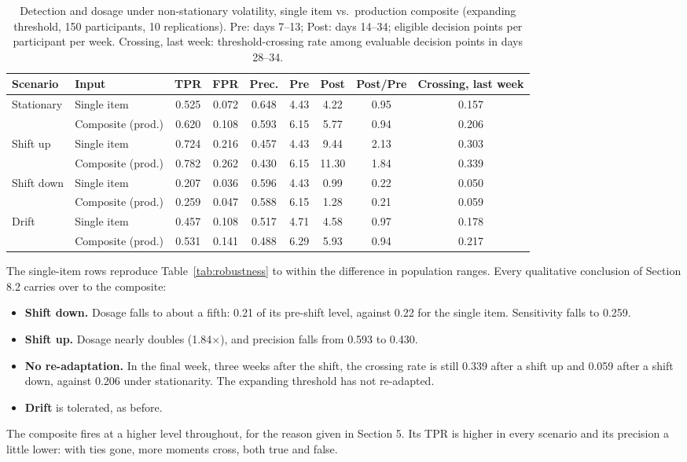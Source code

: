 \documentclass[11pt,letterpaper]{article}
\begin{document}
\begin{table}[htbp]
\centering
\scriptsize
\setlength{\tabcolsep}{4pt}
\begin{tabular}{@{}llccccccc@{}}
\toprule
\textbf{Scenario} & \textbf{Input} & \textbf{TPR} & \textbf{FPR} & \textbf{Prec.} & \textbf{Pre} & \textbf{Post} & \textbf{Post/Pre} & \textbf{Crossing, last week} \\
\midrule
Stationary & Single item & 0.525 & 0.072 & 0.648 & 4.43 & 4.22 & 0.95 & 0.157 \\
 & Composite (prod.) & 0.620 & 0.108 & 0.593 & 6.15 & 5.77 & 0.94 & 0.206 \\
Shift up & Single item & 0.724 & 0.216 & 0.457 & 4.43 & 9.44 & 2.13 & 0.303 \\
 & Composite (prod.) & 0.782 & 0.262 & 0.430 & 6.15 & 11.30 & 1.84 & 0.339 \\
Shift down & Single item & 0.207 & 0.036 & 0.596 & 4.43 & 0.99 & 0.22 & 0.050 \\
 & Composite (prod.) & 0.259 & 0.047 & 0.588 & 6.15 & 1.28 & 0.21 & 0.059 \\
Drift & Single item & 0.457 & 0.108 & 0.517 & 4.71 & 4.58 & 0.97 & 0.178 \\
 & Composite (prod.) & 0.531 & 0.141 & 0.488 & 6.29 & 5.93 & 0.94 & 0.217 \\
\bottomrule
\end{tabular}
\caption{Detection and dosage under non-stationary volatility, single item vs.\ production composite (expanding threshold, 150 participants, 10 replications). Pre: days 7--13; Post: days 14--34; eligible decision points per participant per week. Crossing, last week: threshold-crossing rate among evaluable decision points in days 28--34.}
\label{tab:robustness-composite}
\end{table}

The single-item rows reproduce Table~\ref{tab:robustness} to within the difference in population ranges. Every qualitative conclusion of Section 8.2 carries over to the composite:
\begin{itemize}
    \item \textbf{Shift down.} Dosage falls to about a fifth: 0.21 of its pre-shift level, against 0.22 for the single item. Sensitivity falls to 0.259.
    \item \textbf{Shift up.} Dosage nearly doubles (1.84$\times$), and precision falls from 0.593 to 0.430.
    \item \textbf{No re-adaptation.} In the final week, three weeks after the shift, the crossing rate is still 0.339 after a shift up and 0.059 after a shift down, against 0.206 under stationarity. The expanding threshold has not re-adapted.
    \item \textbf{Drift} is tolerated, as before.
\end{itemize}
The composite fires at a higher level throughout, for the reason given in Section 5. Its TPR is higher in every scenario and its precision a little lower: with ties gone, more moments cross, both true and false.
\end{document}
